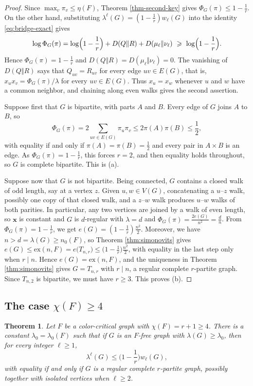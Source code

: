 \documentclass[11pt, a4paper]{article}
\newtheorem{theorem}{Theorem}[section]
\theoremstyle{definition}
\theoremstyle{plain}
\newcommand{\ex}{\mathrm{ex}}
\renewcommand{\le}{\leqslant}
\renewcommand{\ge}{\geqslant}
\begin{document}
\begin{proof}
Since $\max_v\pi_v\le \eta (F)$, Theorem
\ref{thm-second-key} gives $\Phi_G(\pi )\le 1-\frac1r$. On
the other hand, substituting
$\lambda^\ell (G)=(1-\frac1r)w_\ell (G)$ into the identity 
\eqref{eq:bridge-exact} gives
\[
  \log \Phi_G(\pi )=\log \Bigl(1-\frac1r\Bigr)
  +D(Q\Vert R)+D(\mu_\ell \Vert \nu_\ell )
  \ \ge\ \log \Bigl(1-\frac1r\Bigr).
\]
Hence $\Phi_G(\pi )=1-\frac1r$ and
$D(Q\Vert R)=D(\mu_\ell \Vert \nu_\ell )=0$. The vanishing
of $D(Q\Vert R)$ says that $Q_{uv}=R_{uv}$ for every edge
$uv\in E(G)$, that is,
$  x_ux_v = {\Phi_G(\pi )}/{\lambda}$
for every $uv\in E(G)$.
Thus $x_u=x_w$ whenever $u$ and $w$ have a common
neighbor, and chaining along even walks gives the second
assertion.

Suppose first that $G$ is bipartite, with parts $A$ and
$B$. Every edge of $G$ joins $A$ to $B$, so
\[
  \Phi_G(\pi )=2\!\!\sum_{uv\in E(G)}\!\!\pi_u\pi_v
  \le 2\pi (A)\pi (B)\le \frac12 ,
\]
with equality if and only if
$\pi (A)=\pi (B)=\frac12$ and every pair in $A\times B$ is
an edge. As $\Phi_G(\pi )=1-\frac1r$, this forces $r=2$,
and then equality holds throughout, so $G$ is complete
bipartite. This is (a).

Suppose now that $G$ is not bipartite. Being connected,
$G$ contains a closed walk of odd length, say at a vertex
$z$. Given $u,w\in V(G)$, concatenating a $u$--$z$ walk,
possibly one copy of that closed walk, and a $z$--$w$ walk
produces $u$--$w$ walks of both parities. In particular,
any two vertices are joined by a walk of even length, so
$\bm{x}$ is constant and $G$ is $d$-regular with
$\lambda =d$ and
$\Phi_G(\pi )=\frac{2e(G)}{n^2}=\frac dn$. From
$\Phi_G(\pi )=1-\frac1r$, we get
$e(G)=(1-\frac1r)\frac{n^2}{2}$. Moreover, we have 
$n>d=\lambda (G)\ge n_0(F)$, so Theorem
\ref{thm:simonovits} gives
$ e(G)\le \ex (n,F)=e\bigl(T_{n,r}\bigr)
  \le \bigl(1-\frac1r \bigr)\frac{n^2}{2}$,
with equality in the last step only when $r\mid n$. Hence
$e(G)=\ex (n,F)$, and the uniqueness in Theorem
\ref{thm:simonovits} gives $G=T_{n,r}$ with $r\mid n$, a
regular complete $r$-partite graph. Since $T_{n,2}$ is
bipartite, we must have $r\ge 3$. This proves (b).
\end{proof}

\subsection{The case $\chi (F)\ge 4$}

\begin{theorem}
\label{thm:large-lambda-ge4}
Let $F$ be a color-critical graph with
$\chi (F)=r+1\ge 4$. There is a constant
$\lambda_0=\lambda_0(F)$ such that if $G$ is an $F$-free
graph with $\lambda (G)\ge \lambda_0$, then for every
integer $\ell \ge 1$,
\begin{equation}  \label{eq:main-bound-ge4}
  \lambda^\ell(G) \le
  \Big( 1- \frac{1}{r}\Big)w_\ell(G),
\end{equation}
with equality if and only if $G$ is a regular complete
$r$-partite graph, possibly together with isolated
vertices when $\ell \ge 2$. 
\end{theorem} 
\end{document}
